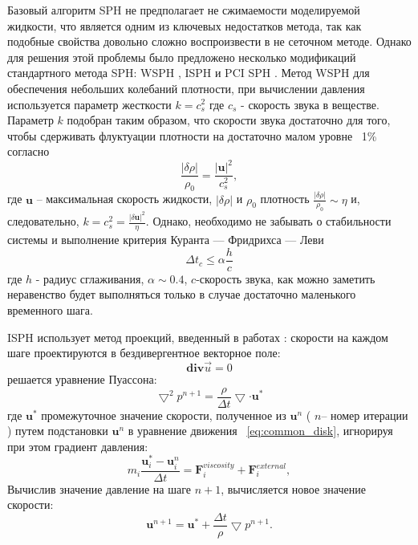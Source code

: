 Базовый алгоритм SPH не предполагает не сжимаемости моделируемой жидкости, что является одним из ключевых недостатков метода, так как подобные свойства довольно сложно воспроизвести в не сеточном методе. Однако для решения этой проблемы было предложено несколько модификаций стандартного метода SPH: WSPH \cite {Becker2007}, ISPH \cite {Shao2003, CUMMINS1999584} и PCI SPH \cite {Solenthaler2009}. Метод WSPH для обеспечения небольших колебаний плотности, при вычислении давления используется параметр жесткости \(k=c_{s}^2\) где \(c_{s}\) - скорость звука в веществе. Параметр \(k\) подобран таким образом, что скорости звука достаточно для того, чтобы сдерживать флуктуации плотности на достаточно малом уровне ~1\%  \cite {Solenthaler2009} согласно \cite {Monaghan2005}
\[
    \frac{\left | \delta \rho \right |}{\rho_{0}}=\frac{\left | \boldsymbol{u} \right |^2}{c_{s}^2},
\]
где \(\boldsymbol{u}\) – максимальная скорость жидкости, \(\left | \delta \rho \right |\) и \(\rho_{0}\) плотность \(\frac{\left | \delta \rho \right |}{\rho_{0}} \sim \eta \) и, следовательно, \(k=c_{s}^{2}=\frac{\left | \delta \boldsymbol{u} \right |^{2}}{\eta}\). Однако, необходимо не  забывать о стабильности системы и выполнение критерия Куранта — Фридрихса — Леви \cite {Courant1967}
\[
    \Delta t_{c} \leq \alpha \frac{h}{c}
\]
где \(h\) - радиус сглаживания, \(\alpha \sim 0.4\), \( c \)-скорость звука, как можно заметить неравенство будет выполняться только в случае достаточно маленького временного шага.

ISPH использует метод проекций, введенный в работах \cite {Temam1968, Chorin1968}: скорости на каждом шаге проектируются в бездивергентное векторное поле:
\[
    \boldsymbol{div}\vec{u}=0
\]
решается уравнение Пуассона:
\begin{equation}
    \label{eq:puasson}
    \bigtriangledown^{2} p^{n+1}=\frac{\rho}{\Delta t}\bigtriangledown \cdot \boldsymbol{u}^{*}
\end{equation}
где \(\boldsymbol{u}^{*}\) промежуточное значение скорости, полученное из \(\boldsymbol{u}^{n}\) ( \(n\)– номер итерации ) путем подстановки \(\boldsymbol{u}^{n}\) в уравнение движения ~\ref{eq:common_disk}, игнорируя при этом градиент давления:
\[
    m_i\frac{\textbf{u}_{i}^{*} -\textbf{u}_{i}^{n}}{\Delta t} = \mathbf{F}_i^{viscosity} + \mathbf{F}_i^{external},
\]
Вычислив значение давление на шаге \( n+1 \), вычисляется новое значение скорости:
\[
    \textbf{u}^{n+1}=\textbf{u}^{*}+\frac{\Delta t}{\rho}\bigtriangledown p^{n+1}.
\]

